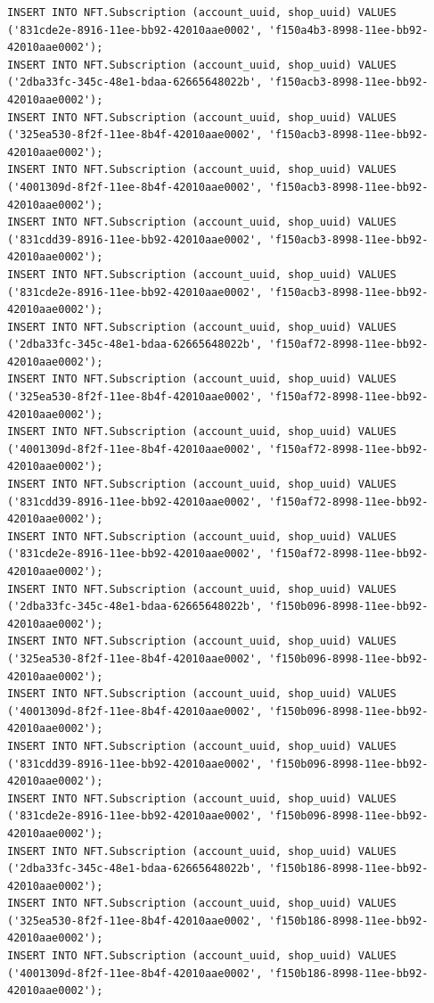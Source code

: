 \documentclass[a4paper, 12pt]{article}
\begin{document}
\begin{lstlisting}
INSERT INTO NFT.Subscription (account_uuid, shop_uuid) VALUES ('831cde2e-8916-11ee-bb92-42010aae0002', 'f150a4b3-8998-11ee-bb92-42010aae0002');
INSERT INTO NFT.Subscription (account_uuid, shop_uuid) VALUES ('2dba33fc-345c-48e1-bdaa-62665648022b', 'f150acb3-8998-11ee-bb92-42010aae0002');
INSERT INTO NFT.Subscription (account_uuid, shop_uuid) VALUES ('325ea530-8f2f-11ee-8b4f-42010aae0002', 'f150acb3-8998-11ee-bb92-42010aae0002');
INSERT INTO NFT.Subscription (account_uuid, shop_uuid) VALUES ('4001309d-8f2f-11ee-8b4f-42010aae0002', 'f150acb3-8998-11ee-bb92-42010aae0002');
INSERT INTO NFT.Subscription (account_uuid, shop_uuid) VALUES ('831cdd39-8916-11ee-bb92-42010aae0002', 'f150acb3-8998-11ee-bb92-42010aae0002');
INSERT INTO NFT.Subscription (account_uuid, shop_uuid) VALUES ('831cde2e-8916-11ee-bb92-42010aae0002', 'f150acb3-8998-11ee-bb92-42010aae0002');
INSERT INTO NFT.Subscription (account_uuid, shop_uuid) VALUES ('2dba33fc-345c-48e1-bdaa-62665648022b', 'f150af72-8998-11ee-bb92-42010aae0002');
INSERT INTO NFT.Subscription (account_uuid, shop_uuid) VALUES ('325ea530-8f2f-11ee-8b4f-42010aae0002', 'f150af72-8998-11ee-bb92-42010aae0002');
INSERT INTO NFT.Subscription (account_uuid, shop_uuid) VALUES ('4001309d-8f2f-11ee-8b4f-42010aae0002', 'f150af72-8998-11ee-bb92-42010aae0002');
INSERT INTO NFT.Subscription (account_uuid, shop_uuid) VALUES ('831cdd39-8916-11ee-bb92-42010aae0002', 'f150af72-8998-11ee-bb92-42010aae0002');
INSERT INTO NFT.Subscription (account_uuid, shop_uuid) VALUES ('831cde2e-8916-11ee-bb92-42010aae0002', 'f150af72-8998-11ee-bb92-42010aae0002');
INSERT INTO NFT.Subscription (account_uuid, shop_uuid) VALUES ('2dba33fc-345c-48e1-bdaa-62665648022b', 'f150b096-8998-11ee-bb92-42010aae0002');
INSERT INTO NFT.Subscription (account_uuid, shop_uuid) VALUES ('325ea530-8f2f-11ee-8b4f-42010aae0002', 'f150b096-8998-11ee-bb92-42010aae0002');
INSERT INTO NFT.Subscription (account_uuid, shop_uuid) VALUES ('4001309d-8f2f-11ee-8b4f-42010aae0002', 'f150b096-8998-11ee-bb92-42010aae0002');
INSERT INTO NFT.Subscription (account_uuid, shop_uuid) VALUES ('831cdd39-8916-11ee-bb92-42010aae0002', 'f150b096-8998-11ee-bb92-42010aae0002');
INSERT INTO NFT.Subscription (account_uuid, shop_uuid) VALUES ('831cde2e-8916-11ee-bb92-42010aae0002', 'f150b096-8998-11ee-bb92-42010aae0002');
INSERT INTO NFT.Subscription (account_uuid, shop_uuid) VALUES ('2dba33fc-345c-48e1-bdaa-62665648022b', 'f150b186-8998-11ee-bb92-42010aae0002');
INSERT INTO NFT.Subscription (account_uuid, shop_uuid) VALUES ('325ea530-8f2f-11ee-8b4f-42010aae0002', 'f150b186-8998-11ee-bb92-42010aae0002');
INSERT INTO NFT.Subscription (account_uuid, shop_uuid) VALUES ('4001309d-8f2f-11ee-8b4f-42010aae0002', 'f150b186-8998-11ee-bb92-42010aae0002');

\end{lstlisting}
\end{document}
